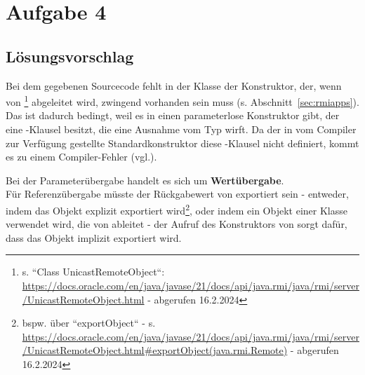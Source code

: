 \section{Aufgabe 4}
\subsection{Lösungsvorschlag}

Bei dem gegebenen Sourcecode fehlt in der Klasse  der Konstruktor, der, wenn von \footnote{
s. ``Class UnicastRemoteObject``: \url{https://docs.oracle.com/en/java/javase/21/docs/api/java.rmi/java/rmi/server/UnicastRemoteObject.html} - abgerufen 16.2.2024
} abgeleitet wird, zwingend vorhanden sein muss (s. Abschnitt~\ref{sec:rmiapps}).\\
Das ist dadurch bedingt, weil es in  einen parameterlose Konstruktor gibt, der eine -Klausel besitzt, die eine Ausnahme vom Typ  wirft.
Da der in  vom Compiler zur Verfügung gestellte Standardkonstruktor diese -Klausel nicht definiert, kommt es zu einem Compiler-Fehler (vgl.\cite[313]{Oec22}).

\noindent
Bei der Parameterübergabe handelt es sich um \textbf{Wertübergabe}.\\
Für Referenzübergabe müsste der Rückgabewert von  exportiert sein - entweder, indem das Objekt explizit exportiert wird\footnote{
bspw. über ``exportObject`` - s. \url{https://docs.oracle.com/en/java/javase/21/docs/api/java.rmi/java/rmi/server/UnicastRemoteObject.html#exportObject(java.rmi.Remote)} - abgerufen 16.2.2024
}, oder indem ein Objekt einer Klasse verwendet wird, die von  ableitet - der Aufruf des Konstruktors von  sorgt dafür, dass das Objekt implizit exportiert wird.
